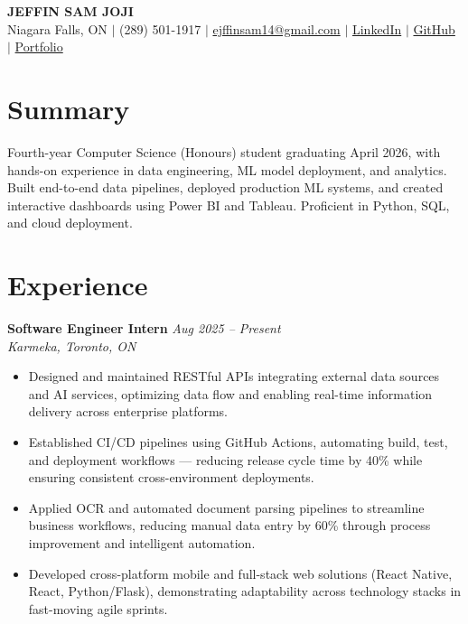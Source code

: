 \documentclass[10pt, letterpaper]{article}
\begin{document}
\begin{center}
  {\huge \textbf{JEFFIN SAM JOJI}} \\[5pt]
  \small
  Niagara Falls, ON \quad$|$\quad
  (289) 501-1917 \quad$|$\quad
  \href{mailto:ejffinsam14@gmail.com}{ejffinsam14@gmail.com} \quad$|$\quad
  \href{https://linkedin.com/in/jeffin-sam-joji}{LinkedIn} \quad$|$\quad
  \href{https://github.com/jeff13in}{GitHub} \quad$|$\quad
  \href{https://jeff13in.github.io/Portfolio}{Portfolio}
\end{center}

\section{Summary}
Fourth-year Computer Science (Honours) student graduating April 2026, with hands-on experience in data engineering, ML model deployment, and analytics. Built end-to-end data pipelines, deployed production ML systems, and created interactive dashboards using Power BI and Tableau. Proficient in Python, SQL, and cloud deployment.

\section{Experience}

\noindent\textbf{Software Engineer Intern} \hfill \textit{Aug 2025 -- Present} \\
\textit{Karmeka, Toronto, ON}
\begin{itemize}
  \item Designed and maintained RESTful APIs integrating external data sources and AI services, optimizing data flow and enabling real-time information delivery across enterprise platforms.
  \item Established CI/CD pipelines using GitHub Actions, automating build, test, and deployment workflows --- reducing release cycle time by 40\% while ensuring consistent cross-environment deployments.
  \item Applied OCR and automated document parsing pipelines to streamline business workflows, reducing manual data entry by 60\% through process improvement and intelligent automation.
  \item Developed cross-platform mobile and full-stack web solutions (React Native, React, Python/Flask), demonstrating adaptability across technology stacks in fast-moving agile sprints.
\end{itemize}
\end{document}
